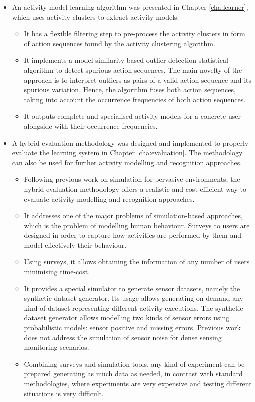 \begin{itemize}
 \item An activity model learning algorithm was presented in Chapter \ref{cha:learner}, which uses activity clusters to extract activity models. %
 \begin{itemize}
  \item It has a flexible filtering step to pre-process the activity clusters in form of action sequences found by the activity clustering algorithm.
  \item It implements a model similarity-based outlier detection statistical algorithm to detect spurious action sequences. The main novelty of the approach is to interpret outliers as pairs of a valid action sequence and its spurious variation. Hence, the algorithm fuses both action sequences, taking into account the occurrence frequencies of both action sequences.
  \item It outputs complete and specialised activity models for a concrete user alongside with their occurrence frequencies.
 \end{itemize}

 \item A hybrid evaluation methodology was designed and implemented to properly evaluate the learning system in Chapter \ref{cha:evaluation}. The methodology can also be used for further activity modelling and recognition approaches. %
 \begin{itemize}
  \item Following previous work on simulation for pervasive environments, the hybrid evaluation methodology offers a realistic and cost-efficient way to evaluate activity modelling and recognition approaches.
  \item It addresses one of the major problems of simulation-based approaches, which is the problem of modelling human behaviour. Surveys to users are designed in order to capture how activities are performed by them and model effectively their behaviour.
  \item Using surveys, it allows obtaining the information of any number of users minimising time-cost.
  \item It provides a special simulator to generate sensor datasets, namely the synthetic dataset generator. Its usage allows generating on demand any kind of dataset representing different activity executions. The synthetic dataset generator allows modelling two kinds of sensor errors using probabilistic models: sensor positive and missing errors. Previous work does not address the simulation of sensor noise for dense sensing monitoring scenarios.
  \item Combining surveys and simulation tools, any kind of experiment can be prepared generating as much data as needed, in contrast with standard methodologies, where experiments are very expensive and testing different situations is very difficult.
 \end{itemize}

\end{itemize}
